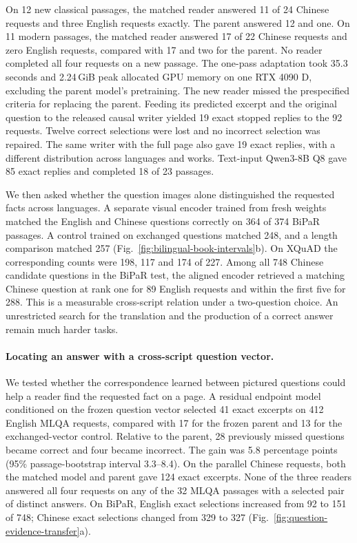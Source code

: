\documentclass[12pt,a4paper]{article}
\providecommand{\DIFadd}[1]{{\protect\color{blue} \sf #1}} %
\begin{document}
\DIFadd{On 12 new classical passages, the matched reader answered 11 of 24 Chinese requests and three English requests exactly. The parent answered 12 and one. On 11 modern passages, the matched reader answered 17 of 22 Chinese requests and zero English requests, compared with 17 and two for the parent. No reader completed all four requests on a new passage. The one-pass adaptation took 35.3 seconds and 2.24\,GiB peak allocated GPU memory on one RTX 4090 D, excluding the parent model's pretraining. The new reader missed the prespecified criteria for replacing the parent. Feeding its predicted excerpt and the original question to the released causal writer yielded 19 exact stopped replies to the 92 requests. Twelve correct selections were lost and no incorrect selection was repaired. The same writer with the full page also gave 19 exact replies, with a different distribution across languages and works. Text-input Qwen3-8B Q8 gave 85 exact replies and completed 18 of 23 passages.
}

\DIFadd{We then asked whether the question images alone distinguished the requested facts across languages. A separate visual encoder trained from fresh weights matched the English and Chinese questions correctly on 364 of 374 BiPaR passages. A control trained on exchanged questions matched 248, and a length comparison matched 257 (Fig.~\ref{fig:bilingual-book-intervals}b). On XQuAD the corresponding counts were 198, 117 and 174 of 227. Among all 748 Chinese candidate questions in the BiPaR test, the aligned encoder retrieved a matching Chinese question at rank one for 89 English requests and within the first five for 288. This is a measurable cross-script relation under a two-question choice. An unrestricted search for the translation and the production of a correct answer remain much harder tasks.
}

\paragraph{\DIFadd{Locating an answer with a cross-script question vector.}}
\DIFadd{We tested whether the correspondence learned between pictured questions could help a reader find the requested fact on a page. A residual endpoint model conditioned on the frozen question vector selected 41 exact excerpts on 412 English MLQA requests, compared with 17 for the frozen parent and 13 for the exchanged-vector control. Relative to the parent, 28 previously missed questions became correct and four became incorrect. The gain was 5.8 percentage points (95\% passage-bootstrap interval 3.3--8.4). On the parallel Chinese requests, both the matched model and parent gave 124 exact excerpts. None of the three readers answered all four requests on any of the 32 MLQA passages with a selected pair of distinct answers. On BiPaR, English exact selections increased from 92 to 151 of 748; Chinese exact selections changed from 329 to 327 (Fig.~\ref{fig:question-evidence-transfer}a).
}
\end{document}
